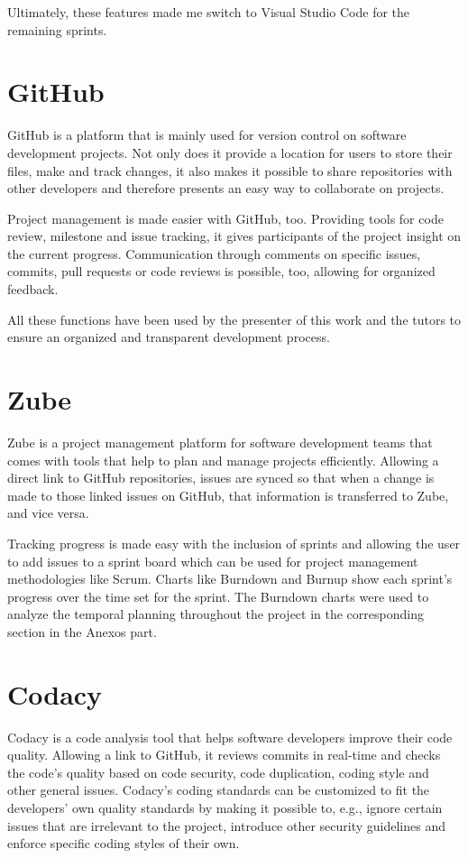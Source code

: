 Ultimately, these features made me switch to Visual Studio Code for the remaining sprints.

\section{GitHub}
GitHub is a platform that is mainly used for version control on software development projects. Not only does it provide a location for users to store their files, make and track changes, it also makes it possible to share repositories with other developers and therefore presents an easy way to collaborate on projects.

Project management is made easier with GitHub, too. Providing tools for code review, milestone and issue tracking, it gives participants of the project insight on the current progress. Communication through comments on specific issues, commits, pull requests or code reviews is possible, too, allowing for organized feedback.

All these functions have been used by the presenter of this work and the tutors to ensure an organized and transparent development process.

\section{Zube}
Zube is a project management platform for software development teams that comes with tools that help to plan and manage projects efficiently. Allowing a direct link to GitHub repositories, issues are synced so that when a change is made to those linked issues on GitHub, that information is transferred to Zube, and vice versa.

Tracking progress is made easy with the inclusion of sprints and allowing the user to add issues to a sprint board which can be used for project management methodologies like Scrum. Charts like Burndown and Burnup show each sprint's progress over the time set for the sprint. The Burndown charts were used to analyze the temporal planning throughout the project in the corresponding section in the Anexos part.

\section{Codacy}
Codacy is a code analysis tool that helps software developers improve their code quality. Allowing a link to GitHub, it reviews commits in real-time and checks the code's quality based on code security, code duplication, coding style and other general issues.
Codacy's coding standards can be customized to fit the developers' own quality standards by making it possible to, e.g., ignore certain issues that are irrelevant to the project, introduce other security guidelines and enforce specific coding styles of their own.